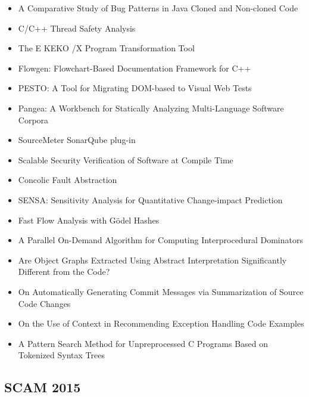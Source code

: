 {\small
\begin{itemize}[itemsep=-1ex]
  \item A Comparative Study of Bug Patterns in Java Cloned and Non-cloned Code
  \item C/C++ Thread Safety Analysis
  \item The E KEKO /X Program Transformation Tool
  \item Flowgen: Flowchart-Based Documentation Framework for C++
  \item PESTO: A Tool for Migrating DOM-based to Visual Web Tests
  \item Pangea: A Workbench for Statically Analyzing Multi-Language Software Corpora
  \item SourceMeter SonarQube plug-in
  \item Scalable Security Verification of Software at Compile Time
  \item Concolic Fault Abstraction
  \item SENSA: Sensitivity Analysis for Quantitative Change-impact Prediction
  \item Fast Flow Analysis with Gödel Hashes
  \item A Parallel On-Demand Algorithm for Computing Interprocedural Dominators
  \item Are Object Graphs Extracted Using Abstract Interpretation Significantly Different from the Code?
  \item On Automatically Generating Commit Messages via Summarization of Source Code Changes
  \item On the Use of Context in Recommending Exception Handling Code Examples
  \item A Pattern Search Method for Unpreprocessed C Programs Based on Tokenized Syntax Trees
\end{itemize}
}

\subsection{SCAM 2015}

